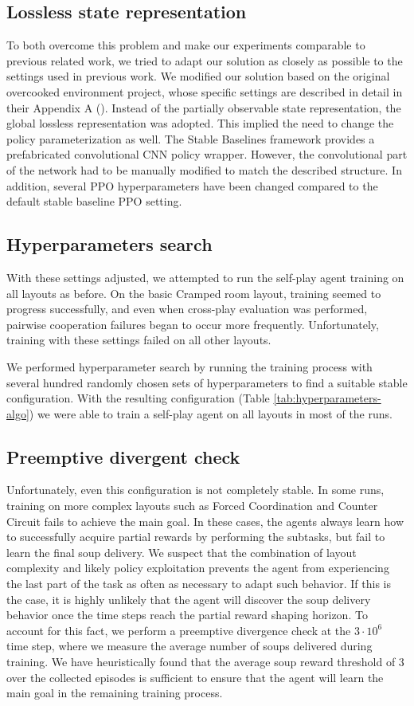 \subsection*{Lossless state representation}
To both overcome this problem and make our experiments comparable to previous related work, we tried to adapt our solution as closely as possible to the settings used in previous work.
We modified our solution based on the original overcooked environment project, whose specific settings are described in detail in their Appendix A (\cite{carroll2020utility}).
Instead of the partially observable state representation, the global lossless representation was adopted.
This implied the need to change the policy parameterization as well.
The Stable Baselines framework provides a prefabricated convolutional CNN policy wrapper.
However, the convolutional part of the network had to be manually modified to match the described structure.
In addition, several PPO hyperparameters have been changed compared to the default stable baseline PPO setting.


\subsection*{Hyperparameters search}
With these settings adjusted, we attempted to run the self-play agent training on all layouts as before.
On the basic Cramped room layout, training seemed to progress successfully, and even when cross-play evaluation was performed, pairwise cooperation failures began to occur more frequently.
Unfortunately, training with these settings failed on all other layouts.

We performed hyperparameter search by running the training process with several hundred randomly chosen sets of hyperparameters to find a suitable stable configuration.
With the resulting configuration (Table \ref{tab:hyperparameters-algo}) we were able to train a self-play agent on all layouts in most of the runs.

\subsection*{Preemptive divergent check}
Unfortunately, even this configuration is not completely stable.
In some runs, training on more complex layouts such as Forced Coordination and Counter Circuit fails to achieve the main goal.
In these cases, the agents always learn how to successfully acquire partial rewards by performing the subtasks, but fail to learn the final soup delivery.
We suspect that the combination of layout complexity and likely policy exploitation prevents the agent from experiencing the last part of the task as often as necessary to adapt such behavior.
If this is the case, it is highly unlikely that the agent will discover the soup delivery behavior once the time steps reach the partial reward shaping horizon.
To account for this fact, we perform a preemptive divergence check at the $3\cdot10^6$ time step, where we measure the average number of soups delivered during training.
We have heuristically found that the average soup reward threshold of $3$ over the collected episodes is sufficient to ensure that the agent will learn the main goal in the remaining training process.


